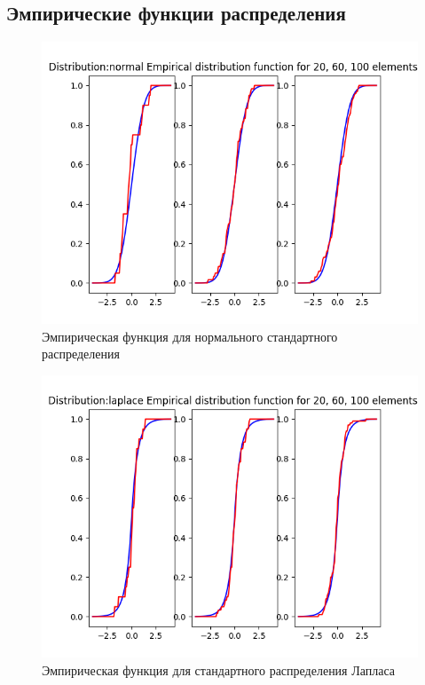 \documentclass[12pt]{article}
\begin{document}
\subsection{Эмпирические функции распределения}
\begin{center}

\begin{figure}[H]
\caption{Эмпирическая функция для нормального стандартного распределения}
\includegraphics[width=\textwidth]{empiric/normal.png}
\end{figure}

\begin{figure}[H]
\caption{Эмпирическая функция для стандартного распределения Лапласа }
\includegraphics[width=\textwidth]{empiric/laplace.png} 
\end{figure}


\end{center}
\end{document}
